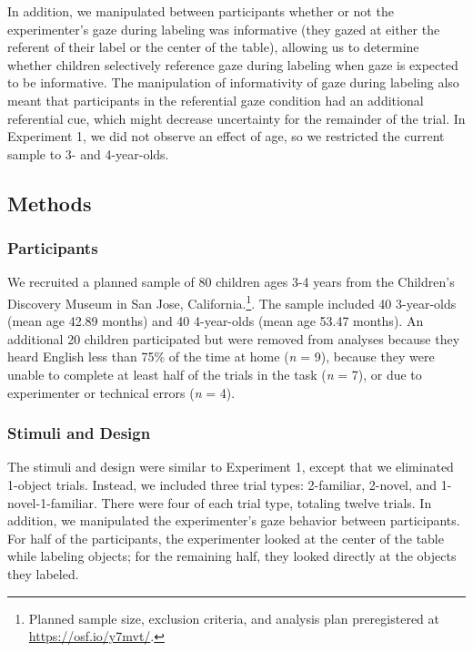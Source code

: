 \documentclass[10pt, letterpaper]{article}
\begin{document}
In addition, we manipulated between participants whether or not the
experimenter's gaze during labeling was informative (they gazed at
either the referent of their label or the center of the table), allowing
us to determine whether children selectively reference gaze during
labeling when gaze is expected to be informative. The manipulation of
informativity of gaze during labeling also meant that participants in
the referential gaze condition had an additional referential cue, which
might decrease uncertainty for the remainder of the trial. In Experiment
1, we did not observe an effect of age, so we restricted the current
sample to 3- and 4-year-olds.

\subsection{Methods}\label{methods-1}

\subsubsection{Participants}\label{participants-1}

We recruited a planned sample of 80 children ages 3-4 years from the
Children's Discovery Museum in San Jose, California.\footnote{Planned
  sample size, exclusion criteria, and analysis plan preregistered at
  \url{https://osf.io/y7mvt/}.}. The sample included 40 3-year-olds
(mean age 42.89 months) and 40 4-year-olds (mean age 53.47 months). An
additional 20 children participated but were removed from analyses
because they heard English less than 75\% of the time at home (\emph{n}
= 9), because they were unable to complete at least half of the trials
in the task (\emph{n} = 7), or due to experimenter or technical errors
(\emph{n} = 4).

\subsubsection{Stimuli and Design}\label{stimuli-and-design-1}

The stimuli and design were similar to Experiment 1, except that we
eliminated 1-object trials. Instead, we included three trial types:
2-familiar, 2-novel, and 1-novel-1-familiar. There were four of each
trial type, totaling twelve trials. In addition, we manipulated the
experimenter's gaze behavior between participants. For half of the
participants, the experimenter looked at the center of the table while
labeling objects; for the remaining half, they looked directly at the
objects they labeled.
\end{document}
